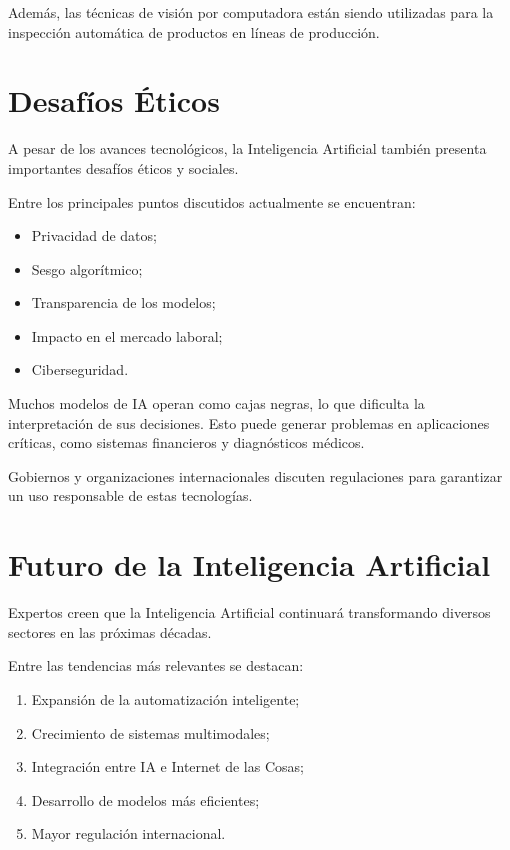 \documentclass[11pt]{article}
\begin{document}
Además, las técnicas de visión por computadora están siendo utilizadas para la inspección automática de
productos en líneas de producción.

\section{Desafíos Éticos}

A pesar de los avances tecnológicos, la Inteligencia Artificial también presenta importantes desafíos éticos y
sociales.

Entre los principales puntos discutidos actualmente se encuentran:

\begin{itemize}
    \item Privacidad de datos;
    \item Sesgo algorítmico;
    \item Transparencia de los modelos;
    \item Impacto en el mercado laboral;
    \item Ciberseguridad.
\end{itemize}

Muchos modelos de IA operan como cajas negras, lo que dificulta la interpretación de sus decisiones.
Esto puede generar problemas en aplicaciones críticas, como sistemas financieros y diagnósticos
médicos.

Gobiernos y organizaciones internacionales discuten regulaciones para garantizar un uso
responsable de estas tecnologías. 

\section{Futuro de la Inteligencia Artificial}

Expertos creen que la Inteligencia Artificial continuará transformando diversos sectores
en las próximas décadas.

Entre las tendencias más relevantes se destacan:

\begin{enumerate}
    \item Expansión de la automatización inteligente;
    \item Crecimiento de sistemas multimodales;
    \item Integración entre IA e Internet de las Cosas;
    \item Desarrollo de modelos más eficientes;
    \item Mayor regulación internacional.
\end{enumerate}
\end{document}

